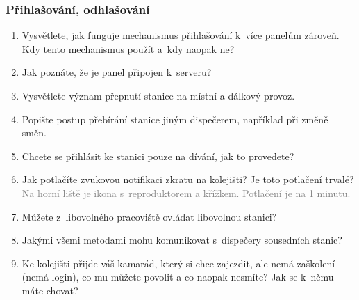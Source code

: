 \documentclass[12pt,a4paper]{article}
\newcommand{\solution}[1]{\\ \textcolor{gray}{#1}}
\newcommand{\solution}[1]{}
\begin{document}
\subsubsection*{Přihlašování, odhlašování}
\begin{enumerate}[leftmargin=*]

\item Vysvětlete, jak funguje mechanismus přihlašování k~více panelům zároveň.
Kdy tento mechanismus použít a~kdy naopak ne?

\item Jak poznáte, že je panel připojen k~serveru?

\item Vysvětlete význam přepnutí stanice na místní a dálkový provoz.

\item Popište postup přebírání stanice jiným dispečerem, například při změně
směn.

\item Chcete se přihlásit ke stanici pouze na dívání, jak to provedete?

\item Jak potlačíte zvukovou notifikaci zkratu na kolejišti? Je toto
potlačení trvalé?
\solution{Na horní liště je ikona s~reproduktorem a křížkem. Potlačení je na 1
minutu.}

\item Můžete z~libovolného pracoviště ovládat libovolnou stanici?

\item Jakými všemi metodami mohu komunikovat s~dispečery sousedních stanic?

\item Ke kolejišti přijde váš kamarád, který si chce zajezdit, ale nemá
zaškolení (nemá login), co mu můžete povolit a co naopak nesmíte? Jak se k~němu
máte chovat?

\end{enumerate}
\end{document}
